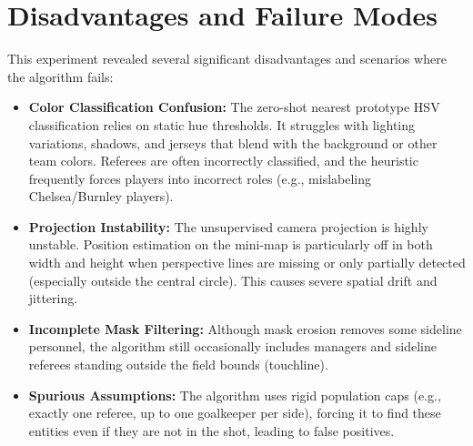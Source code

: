 \documentclass[11pt]{article}
\begin{document}
\section{Disadvantages and Failure Modes}
This experiment revealed several significant disadvantages and scenarios where the algorithm fails:
\begin{itemize}[leftmargin=*]
    \item \textbf{Color Classification Confusion:} The zero-shot nearest prototype HSV classification relies on static hue thresholds. It struggles with lighting variations, shadows, and jerseys that blend with the background or other team colors. Referees are often incorrectly classified, and the heuristic frequently forces players into incorrect roles (e.g., mislabeling Chelsea/Burnley players).
    \item \textbf{Projection Instability:} The unsupervised camera projection is highly unstable. Position estimation on the mini-map is particularly off in both width and height when perspective lines are missing or only partially detected (especially outside the central circle). This causes severe spatial drift and jittering.
    \item \textbf{Incomplete Mask Filtering:} Although mask erosion removes some sideline personnel, the algorithm still occasionally includes managers and sideline referees standing outside the field bounds (touchline).
    \item \textbf{Spurious Assumptions:} The algorithm uses rigid population caps (e.g., exactly one referee, up to one goalkeeper per side), forcing it to find these entities even if they are not in the shot, leading to false positives.
\end{itemize}
\end{document}
